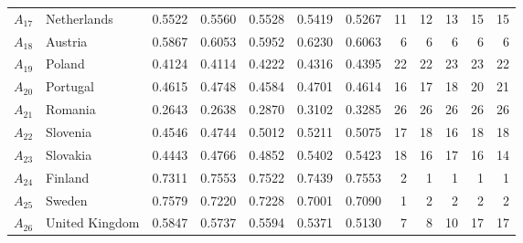\documentclass[final,5p,times,twocolumn,authoryear]{elsarticle}
\begin{document}
\begin{table}[ht!]
{\begin{tabular}{llrrrrrrrrrr}
$A_{17}$ & Netherlands & 0.5522 & 0.5560 & 0.5528 & 0.5419 & 0.5267 & 11 & 12 & 13 & 15 & 15 \\
$A_{18}$ & Austria & 0.5867 & 0.6053 & 0.5952 & 0.6230 & 0.6063 & 6 & 6 & 6 & 6 & 6 \\
$A_{19}$ & Poland & 0.4124 & 0.4114 & 0.4222 & 0.4316 & 0.4395 & 22 & 22 & 23 & 23 & 22 \\
$A_{20}$ & Portugal & 0.4615 & 0.4748 & 0.4584 & 0.4701 & 0.4614 & 16 & 17 & 18 & 20 & 21 \\
$A_{21}$ & Romania & 0.2643 & 0.2638 & 0.2870 & 0.3102 & 0.3285 & 26 & 26 & 26 & 26 & 26 \\
$A_{22}$ & Slovenia & 0.4546 & 0.4744 & 0.5012 & 0.5211 & 0.5075 & 17 & 18 & 16 & 18 & 18 \\
$A_{23}$ & Slovakia & 0.4443 & 0.4766 & 0.4852 & 0.5402 & 0.5423 & 18 & 16 & 17 & 16 & 14 \\
$A_{24}$ & Finland & 0.7311 & 0.7553 & 0.7522 & 0.7439 & 0.7553 & 2 & 1 & 1 & 1 & 1 \\
$A_{25}$ & Sweden & 0.7579 & 0.7220 & 0.7228 & 0.7001 & 0.7090 & 1 & 2 & 2 & 2 & 2 \\
$A_{26}$ & United Kingdom & 0.5847 & 0.5737 & 0.5594 & 0.5371 & 0.5130 & 7 & 8 & 10 & 17 & 17 \\ \bottomrule
\end{tabular}
}
\end{table}
\end{document}
